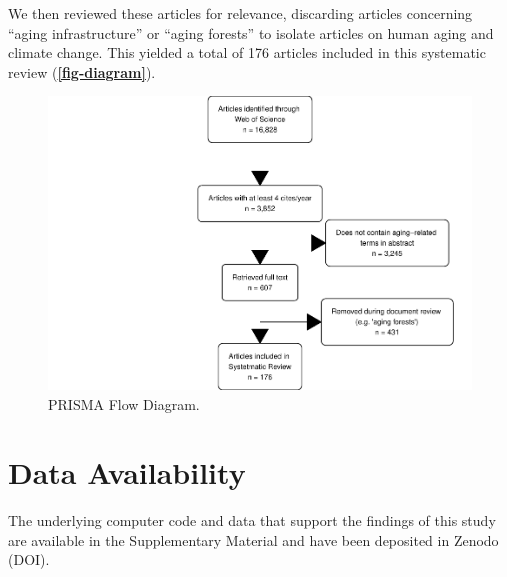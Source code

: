 \documentclass[12pt]{article}
\begin{document}
We then reviewed these articles for relevance, discarding articles
concerning ``aging infrastructure'' or ``aging forests'' to isolate
articles on human aging and climate change. This yielded a total of 176
articles included in this systematic review
(\textbf{\autoref{fig-diagram}}).

\begin{figure}
\centering
\includegraphics{MainDocument_files/figure-latex/figureflowdiagram-1.pdf}
\caption{PRISMA Flow Diagram. \label{fig-diagram}}
\end{figure}

\hypertarget{data-availability}{%
\section{Data Availability}\label{data-availability}}

The underlying computer code and data that support the findings of this
study are available in the Supplementary Material and have been
deposited in Zenodo (DOI).



\end{document}
